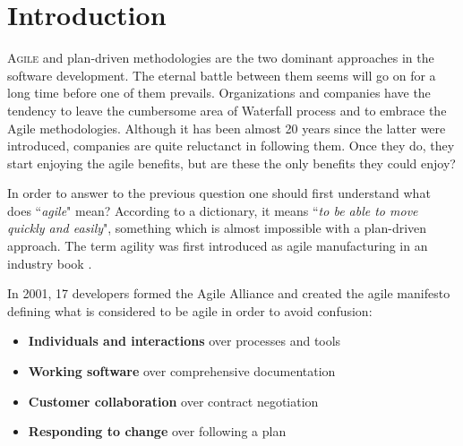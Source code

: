 \chapter{Introduction}

\lettrine[lines=4, loversize=-0.1, lraise=0.1]{A}{gile} and plan-driven methodologies are the two dominant approaches in the software development. The eternal battle between them seems will go on for a long time before  one of them prevails. Organizations and companies have the tendency to leave the cumbersome area of Waterfall process and to embrace the Agile methodologies. Although it has been almost 20 years since the latter were introduced, companies are quite reluctanct in following them. Once they do, they start enjoying the agile benefits, but are these the only benefits they could enjoy? 

In order to answer to the previous question one should first understand what does ``\textit{agile}" mean? According to a dictionary, it means ``\textit{to be able to move quickly and easily}", something which is almost impossible with a plan-driven approach. The term agility was first introduced as agile manufacturing in an industry book \cite{agile_manufacturing}.

In 2001, 17 developers formed the Agile Alliance and created the agile manifesto \cite{beck2001agile} defining what is considered to be agile in order to avoid confusion:  
\begin{itemize}
	\item {\large \textbf{Individuals and interactions}} over processes and tools
	\item {\large \textbf{Working software}} over comprehensive documentation
	\item {\large \textbf{Customer collaboration}} over contract negotiation
	\item {\large \textbf{Responding to change}} over following a plan
\end{itemize}

